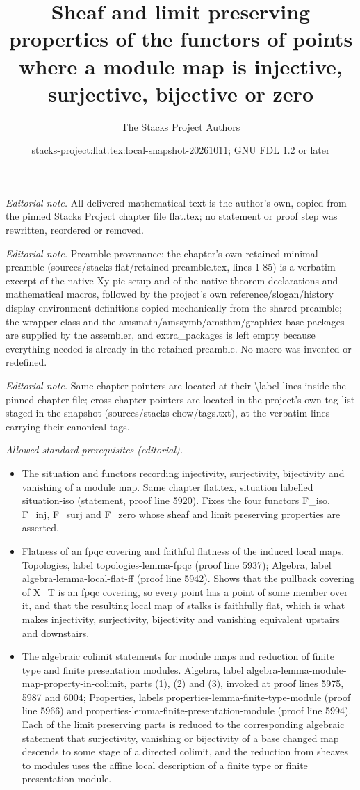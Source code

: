 \documentclass[10pt,a4paper]{amsart}
\title{Sheaf and limit preserving properties of the functors of points where a module map is injective, surjective, bijective or zero}
\author{The Stacks Project Authors}
\date{stacks-project:flat.tex:local-snapshot-20261011; GNU FDL 1.2 or later}
\theoremstyle{plain}
\theoremstyle{definition}
\theoremstyle{remark}
\numberwithin{equation}{subsection}
\begin{document}
\maketitle
\noindent\textit{Editorial note.} All delivered mathematical text is the author's own, copied from the pinned Stacks Project chapter file flat.tex; no statement or proof step was rewritten, reordered or removed.\par\medskip
\noindent\textit{Editorial note.} Preamble provenance: the chapter's own retained minimal preamble (sources/stacks-flat/retained-preamble.tex, lines 1-85) is a verbatim excerpt of the native Xy-pic setup and of the native theorem declarations and mathematical macros, followed by the project's own reference/slogan/history display-environment definitions copied mechanically from the shared preamble; the wrapper class and the amsmath/amssymb/amsthm/graphicx base packages are supplied by the assembler, and extra\_packages is left empty because everything needed is already in the retained preamble. No macro was invented or redefined.\par\medskip
\noindent\textit{Editorial note.} Same-chapter pointers are located at their \textbackslash{}label lines inside the pinned chapter file; cross-chapter pointers are located in the project's own tag list staged in the snapshot (sources/stacks-chow/tags.txt), at the verbatim lines carrying their canonical tags.\par\medskip
\noindent\textit{Allowed standard prerequisites (editorial).}\begin{itemize}
\item The situation and functors recording injectivity, surjectivity, bijectivity and vanishing of a module map. Same chapter flat.tex, situation labelled situation-iso (statement, proof line 5920). Fixes the four functors F\_iso, F\_inj, F\_surj and F\_zero whose sheaf and limit preserving properties are asserted.
\item Flatness of an fpqc covering and faithful flatness of the induced local maps. Topologies, label topologies-lemma-fpqc (proof line 5937); Algebra, label algebra-lemma-local-flat-ff (proof line 5942). Shows that the pullback covering of X\_T is an fpqc covering, so every point has a point of some member over it, and that the resulting local map of stalks is faithfully flat, which is what makes injectivity, surjectivity, bijectivity and vanishing equivalent upstairs and downstairs.
\item The algebraic colimit statements for module maps and reduction of finite type and finite presentation modules. Algebra, label algebra-lemma-module-map-property-in-colimit, parts (1), (2) and (3), invoked at proof lines 5975, 5987 and 6004; Properties, labels properties-lemma-finite-type-module (proof line 5966) and properties-lemma-finite-presentation-module (proof line 5994). Each of the limit preserving parts is reduced to the corresponding algebraic statement that surjectivity, vanishing or bijectivity of a base changed map descends to some stage of a directed colimit, and the reduction from sheaves to modules uses the affine local description of a finite type or finite presentation module.
\end{itemize}\medskip
\end{document}
